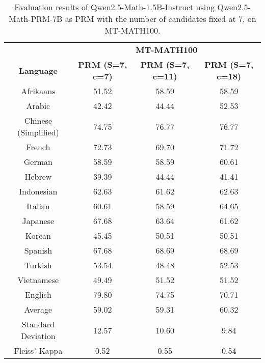 \begin{table*}[]
\centering
\fontsize{10}{13} \selectfont
\begin{tabular}{c|c|c|c}
\toprule
 & \multicolumn{3}{c}{\textbf{MT-MATH100}} \\ \cmidrule{2-4}
\multirow{-2}{*}{\textbf{Language}} & \multicolumn{1}{c|}{\textbf{PRM (S=7, c=7)}} & \multicolumn{1}{c|}{\textbf{PRM (S=7, c=11)}} & \multicolumn{1}{c}{\textbf{PRM (S=7, c=18)}} \\ \midrule
Afrikaans & 51.52 & 58.59 & 58.59 \\
Arabic & 42.42 & 44.44 & 52.53 \\
Chinese (Simplified) & 74.75 & 76.77 & 76.77 \\
French & 72.73 & 69.70 & 71.72 \\
German & 58.59 & 58.59 & 60.61 \\
Hebrew & 39.39 & 44.44 & 41.41 \\
Indonesian & 62.63 & 61.62 & 62.63 \\
Italian & 60.61 & 58.59 & 64.65 \\
Japanese & 67.68 & 63.64 & 61.62 \\
Korean & 45.45 & 50.51 & 50.51 \\
Spanish & 67.68 & 68.69 & 68.69 \\
Turkish & 53.54 & 48.48 & 52.53 \\
Vietnamese & 49.49 & 51.52 & 51.52 \\
\rowcolor[HTML]{FCE5CD}English & 79.80 & 74.75 & 70.71 \\ \midrule
Average & 59.02 & 59.31 & 60.32 \\
Standard Deviation & 12.57 & 10.60 & 9.84 \\
Fleiss' Kappa & 0.52 & 0.55 & 0.54 \\ \bottomrule
\end{tabular}
\caption{\footnotesize Evaluation results of Qwen2.5-Math-1.5B-Instruct using Qwen2.5-Math-PRM-7B as PRM with the number of candidates fixed at 7, on MT-MATH100.}
\label{tab:1_5B_prm_7B_s7}
\end{table*}

